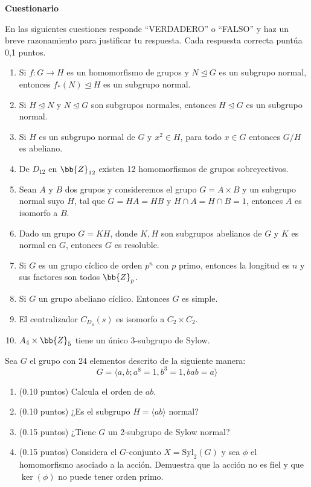 \documentclass[12pt]{article}
\begin{document}
    \begin{ejercicio}[1.0 punto]
        \textbf{Cuestionario}

        En las siguientes cuestiones responde ``VERDADERO'' o ``FALSO'' y haz un breve razonamiento para justificar tu respuesta. Cada respuesta correcta puntúa 0,1 puntos.

        \begin{enumerate}[label=\arabic*)]
            \item  Si $f : G \to H$ es un homomorfismo de grupos y $N \trianglelefteq G$ es un subgrupo normal, entonces $f_*(N) \trianglelefteq H$ es un subgrupo normal.
            \item  Si $H \trianglelefteq N$ y $N \trianglelefteq G$ son subgrupos normales, entonces $H \trianglelefteq G$ es un subgrupo normal.
            \item  Si $H$ es un subgrupo normal de $G$ y $x^2 \in H$, para todo $x \in G$ entonces $G/H$ es abeliano.
            \item  De $D_{12}$ en $\bb{Z}_{12}$ existen 12 homomorfismos de grupos sobreyectivos.
            \item  Sean $A$ y $B$ dos grupos y consideremos el grupo $G = A \times B$ y un subgrupo normal suyo $H$, tal que $G = HA = HB$ y $H \cap A = H \cap B = 1$, entonces $A$ es isomorfo a $B$.
            \item  Dado un grupo $G = KH$, donde $K, H$ son subgrupos abelianos de $G$ y $K$ es normal en $G$, entonces $G$ es resoluble.
            \item  Si $G$ es un grupo cíclico de orden $p^n$ con $p$ primo, entonces la longitud es $n$ y sus factores son todos $\bb{Z}_p$.
            \item  Si $G$ un grupo abeliano cíclico. Entonces $G$ es simple.
            \item  El centralizador $C_{D_4}(s)$ es isomorfo a $C_2 \times C_2$.
            \item  $A_4 \times \bb{Z}_5$ tiene un único 3-subgrupo de Sylow.
        \end{enumerate}
    \end{ejercicio}

    \begin{ejercicio}[0.5 puntos]
        Sea $G$ el grupo con 24 elementos descrito de la siguiente manera:
        \[
        G = \langle a, b ; a^8 = 1, b^3 = 1, bab = a \rangle
        \]
        \begin{enumerate}[label=\alph*)]
            \item (0.10 puntos) Calcula el orden de $ab$.
            \item (0.10 puntos) ¿Es el subgrupo $H = \langle ab \rangle$ normal?
            \item (0.15 puntos) ¿Tiene $G$ un 2-subgrupo de Sylow normal?
            \item (0.15 puntos) Considera el $G$-conjunto $X = \text{Syl}_2(G)$ y sea $\phi$ el homomorfismo asociado a la acción. Demuestra que la acción no es fiel y que $\ker(\phi)$ no puede tener orden primo.
        \end{enumerate}
    \end{ejercicio}
\end{document}
